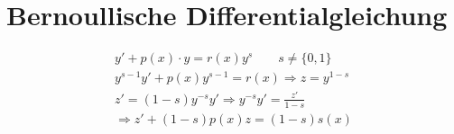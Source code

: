 \section{Bernoullische Differentialgleichung}

\begin{align*}
y'+p(x)\cdot y = r(x)y^{s}\qquad s\neq\{0,1\}\\
y^{s-1}y' + p(x)y^{s-1} = r(x)\Rightarrow z=y^{1-s}\\
z'=(1-s)y^{-s}y'\Rightarrow y^{-s}y'=\frac{z'}{1-s}\\
\Longrightarrow \boxed{z'+(1-s)p(x)z= (1-s)s(x)}
\end{align*}